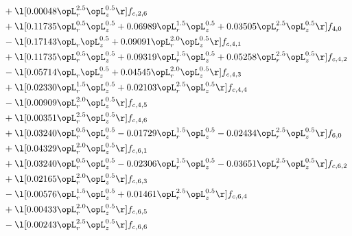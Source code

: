 \begin{alignat}{2}
& + \l[  0.00048 \opL_r^{2.5} \opL_z^{0.5}  \r] f_{c,2,6} \nonumber \\ 
& + \l[  0.11735 \opL_r^{0.5} \opL_z^{0.5} +  0.06989 \opL_r^{1.5} \opL_z^{0.5} +  0.03505 \opL_r^{2.5} \opL_z^{0.5}  \r] f_{4,0} \nonumber \\ 
& - \l[  0.17143 \opL_r \opL_z^{0.5} +  0.09091 \opL_r^{2.0} \opL_z^{0.5}  \r] f_{c,4,1} \nonumber \\ 
& + \l[  0.11735 \opL_r^{0.5} \opL_z^{0.5} +  0.09319 \opL_r^{1.5} \opL_z^{0.5} +  0.05258 \opL_r^{2.5} \opL_z^{0.5}  \r] f_{c,4,2} \nonumber \\ 
& - \l[  0.05714 \opL_r \opL_z^{0.5} +  0.04545 \opL_r^{2.0} \opL_z^{0.5}  \r] f_{c,4,3} \nonumber \\ 
& + \l[  0.02330 \opL_r^{1.5} \opL_z^{0.5} +  0.02103 \opL_r^{2.5} \opL_z^{0.5}  \r] f_{c,4,4} \nonumber \\ 
& - \l[  0.00909 \opL_r^{2.0} \opL_z^{0.5}  \r] f_{c,4,5} \nonumber \\ 
& + \l[  0.00351 \opL_r^{2.5} \opL_z^{0.5}  \r] f_{c,4,6} \nonumber \\ 
& + \l[  0.03240 \opL_r^{0.5} \opL_z^{0.5}   -0.01729 \opL_r^{1.5} \opL_z^{0.5}   -0.02434 \opL_r^{2.5} \opL_z^{0.5}  \r] f_{6,0} \nonumber \\ 
& + \l[  0.04329 \opL_r^{2.0} \opL_z^{0.5}  \r] f_{c,6,1} \nonumber \\ 
& + \l[  0.03240 \opL_r^{0.5} \opL_z^{0.5}   -0.02306 \opL_r^{1.5} \opL_z^{0.5}   -0.03651 \opL_r^{2.5} \opL_z^{0.5}  \r] f_{c,6,2} \nonumber \\ 
& + \l[  0.02165 \opL_r^{2.0} \opL_z^{0.5}  \r] f_{c,6,3} \nonumber \\ 
& - \l[  0.00576 \opL_r^{1.5} \opL_z^{0.5} +  0.01461 \opL_r^{2.5} \opL_z^{0.5}  \r] f_{c,6,4} \nonumber \\ 
& + \l[  0.00433 \opL_r^{2.0} \opL_z^{0.5}  \r] f_{c,6,5} \nonumber \\ 
& - \l[  0.00243 \opL_r^{2.5} \opL_z^{0.5}  \r] f_{c,6,6} \nonumber \\ 
\end{alignat} 


